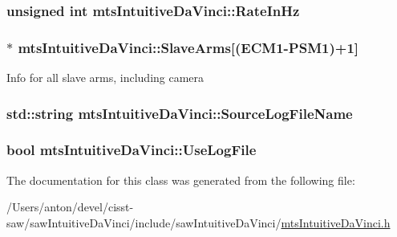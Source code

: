 \subsubsection[{Rate\+In\+Hz}]{\setlength{\rightskip}{0pt plus 5cm}unsigned int mts\+Intuitive\+Da\+Vinci\+::\+Rate\+In\+Hz\hspace{0.3cm}{\ttfamily [protected]}}\label{classmts_intuitive_da_vinci_a1780b24f6582c60ff94f2e1d03ef7060}
\hypertarget{classmts_intuitive_da_vinci_ad974917d88b89bca109656a8e1ab7238}{}
\subsubsection[{Slave\+Arms}]{$\ast$ mts\+Intuitive\+Da\+Vinci\+::\+Slave\+Arms\mbox{[}({\bf E\+C\+M1}-\/{\bf P\+S\+M1})+1\mbox{]}\hspace{0.3cm}{\ttfamily [protected]}}\label{classmts_intuitive_da_vinci_ad974917d88b89bca109656a8e1ab7238}
Info for all slave arms, including camera \hypertarget{classmts_intuitive_da_vinci_abd697468b4bd68e40664e73ca6af5692}{}
\subsubsection[{Source\+Log\+File\+Name}]{\setlength{\rightskip}{0pt plus 5cm}std\+::string mts\+Intuitive\+Da\+Vinci\+::\+Source\+Log\+File\+Name\hspace{0.3cm}{\ttfamily [protected]}}\label{classmts_intuitive_da_vinci_abd697468b4bd68e40664e73ca6af5692}
\hypertarget{classmts_intuitive_da_vinci_a19a2398dbc1a8369da7295119fb8abbc}{}
\subsubsection[{Use\+Log\+File}]{\setlength{\rightskip}{0pt plus 5cm}bool mts\+Intuitive\+Da\+Vinci\+::\+Use\+Log\+File\hspace{0.3cm}{\ttfamily [protected]}}\label{classmts_intuitive_da_vinci_a19a2398dbc1a8369da7295119fb8abbc}


The documentation for this class was generated from the following file\+:\begin{DoxyCompactItemize}
\item 
/\+Users/anton/devel/cisst-\/saw/saw\+Intuitive\+Da\+Vinci/include/saw\+Intuitive\+Da\+Vinci/\hyperlink{mts_intuitive_da_vinci_8h}{mts\+Intuitive\+Da\+Vinci.\+h}\end{DoxyCompactItemize}
